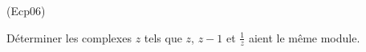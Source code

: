 \begin{tiny}(Ecp06)\end{tiny}
D{\'e}terminer les complexes $z$ tels que $z$, $z-1$ et $\frac{1}{z}$ aient le m{\^e}me module.